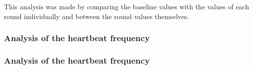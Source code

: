 This analysis was made by comparing the baseline values with the values of each round individually and between the round values themselves.

\subsubsection{Analysis of the heartbeat frequency}



%
%
\subsubsection{Analysis of the heartbeat frequency}
%
